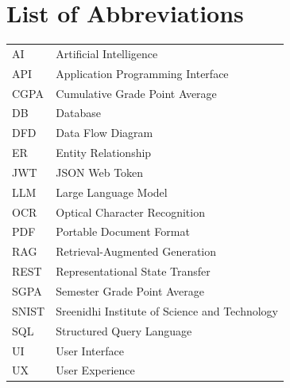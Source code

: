 \chapter*{List of Abbreviations}

\begin{longtable}{p{}p{}}
AI & Artificial Intelligence \\
API & Application Programming Interface \\
CGPA & Cumulative Grade Point Average \\
DB & Database \\
DFD & Data Flow Diagram \\
ER & Entity Relationship \\
JWT & JSON Web Token \\
LLM & Large Language Model \\
OCR & Optical Character Recognition \\
PDF & Portable Document Format \\
RAG & Retrieval-Augmented Generation \\
REST & Representational State Transfer \\
SGPA & Semester Grade Point Average \\
SNIST & Sreenidhi Institute of Science and Technology \\
SQL & Structured Query Language \\
UI & User Interface \\
UX & User Experience \\
\end{longtable}

\clearpage
